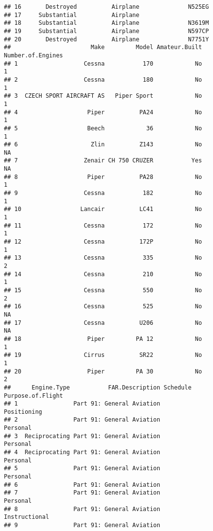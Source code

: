 \documentclass[]{article}
\begin{document}
\begin{verbatim}
## 16       Destroyed          Airplane              N525EG
## 17     Substantial          Airplane                    
## 18     Substantial          Airplane              N3619M
## 19     Substantial          Airplane              N597CP
## 20       Destroyed          Airplane              N7751Y
##                       Make         Model Amateur.Built Number.of.Engines
## 1                   Cessna           170            No                 1
## 2                   Cessna           180            No                 1
## 3  CZECH SPORT AIRCRAFT AS   Piper Sport            No                 1
## 4                    Piper          PA24            No                 1
## 5                    Beech            36            No                 1
## 6                     Zlin          Z143            No                NA
## 7                   Zenair CH 750 CRUZER           Yes                NA
## 8                    Piper          PA28            No                 1
## 9                   Cessna           182            No                 1
## 10                 Lancair          LC41            No                 1
## 11                  Cessna           172            No                 1
## 12                  Cessna          172P            No                 1
## 13                  Cessna           335            No                 2
## 14                  Cessna           210            No                 1
## 15                  Cessna           550            No                 2
## 16                  Cessna           525            No                NA
## 17                  Cessna          U206            No                NA
## 18                   Piper         PA 12            No                 1
## 19                  Cirrus          SR22            No                 1
## 20                   Piper         PA 30            No                 2
##      Engine.Type           FAR.Description Schedule Purpose.of.Flight
## 1                Part 91: General Aviation                Positioning
## 2                Part 91: General Aviation                   Personal
## 3  Reciprocating Part 91: General Aviation                   Personal
## 4  Reciprocating Part 91: General Aviation                   Personal
## 5                Part 91: General Aviation                   Personal
## 6                Part 91: General Aviation                           
## 7                Part 91: General Aviation                   Personal
## 8                Part 91: General Aviation              Instructional
## 9                Part 91: General Aviation                           

\end{verbatim}
\end{document}
